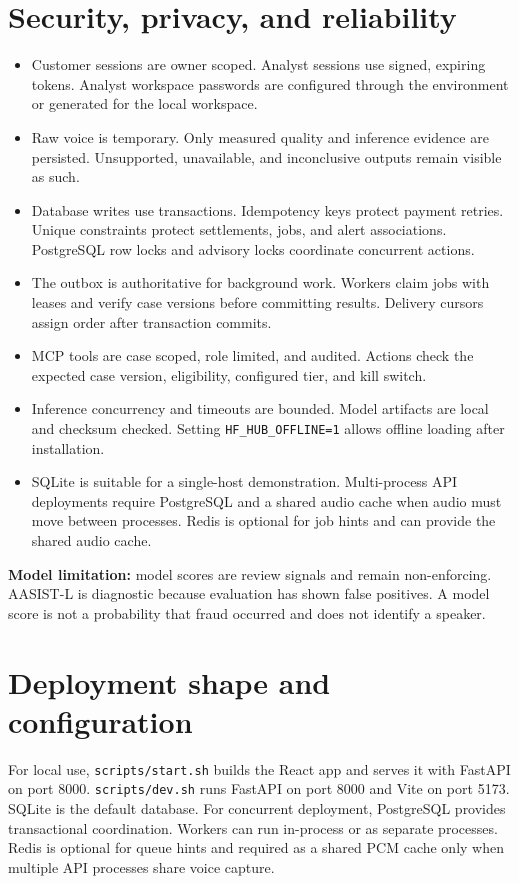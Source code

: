 \documentclass[11pt,a4paper]{article}
\begin{document}
\section{Security, privacy, and reliability}
\begin{itemize}
\item Customer sessions are owner scoped. Analyst sessions use signed, expiring tokens. Analyst workspace passwords are configured through the environment or generated for the local workspace.
\item Raw voice is temporary. Only measured quality and inference evidence are persisted. Unsupported, unavailable, and inconclusive outputs remain visible as such.
\item Database writes use transactions. Idempotency keys protect payment retries. Unique constraints protect settlements, jobs, and alert associations. PostgreSQL row locks and advisory locks coordinate concurrent actions.
\item The outbox is authoritative for background work. Workers claim jobs with leases and verify case versions before committing results. Delivery cursors assign order after transaction commits.
\item MCP tools are case scoped, role limited, and audited. Actions check the expected case version, eligibility, configured tier, and kill switch.
\item Inference concurrency and timeouts are bounded. Model artifacts are local and checksum checked. Setting \texttt{HF\_HUB\_OFFLINE=1} allows offline loading after installation.
\item SQLite is suitable for a single-host demonstration. Multi-process API deployments require PostgreSQL and a shared audio cache when audio must move between processes. Redis is optional for job hints and can provide the shared audio cache.
\end{itemize}
\textbf{Model limitation:} model scores are review signals and remain non-enforcing. AASIST-L is diagnostic because evaluation has shown false positives. A model score is not a probability that fraud occurred and does not identify a speaker.

\section{Deployment shape and configuration}
For local use, \texttt{scripts/start.sh} builds the React app and serves it with FastAPI on port 8000. \texttt{scripts/dev.sh} runs FastAPI on port 8000 and Vite on port 5173. SQLite is the default database. For concurrent deployment, PostgreSQL provides transactional coordination. Workers can run in-process or as separate processes. Redis is optional for queue hints and required as a shared PCM cache only when multiple API processes share voice capture.
\end{document}
